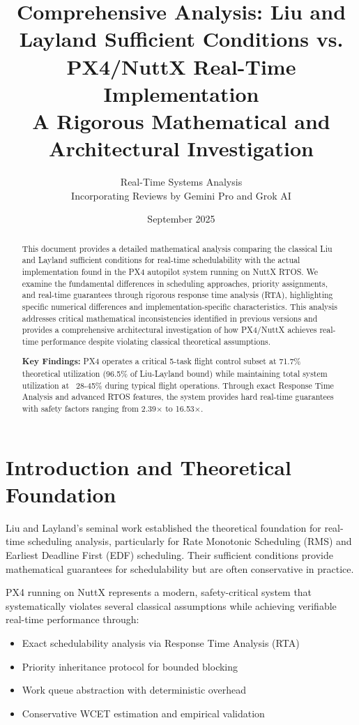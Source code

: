 \documentclass[12pt,a4paper]{article}
\title{Comprehensive Analysis: Liu and Layland Sufficient Conditions vs. PX4/NuttX Real-Time Implementation\\
\large{A Rigorous Mathematical and Architectural Investigation}}
\author{Real-Time Systems Analysis\\
\small{Incorporating Reviews by Gemini Pro and Grok AI}}
\date{September 2025}
\begin{document}
\maketitle

\begin{abstract}
This document provides a detailed mathematical analysis comparing the classical Liu and Layland sufficient conditions for real-time schedulability with the actual implementation found in the PX4 autopilot system running on NuttX RTOS. We examine the fundamental differences in scheduling approaches, priority assignments, and real-time guarantees through rigorous response time analysis (RTA), highlighting specific numerical differences and implementation-specific characteristics. This analysis addresses critical mathematical inconsistencies identified in previous versions and provides a comprehensive architectural investigation of how PX4/NuttX achieves real-time performance despite violating classical theoretical assumptions.

\textbf{Key Findings:} PX4 operates a critical 5-task flight control subset at 71.7\% theoretical utilization (96.5\% of Liu-Layland bound) while maintaining total system utilization at ~28-45\% during typical flight operations. Through exact Response Time Analysis and advanced RTOS features, the system provides hard real-time guarantees with safety factors ranging from 2.39$\times$ to 16.53$\times$.
\end{abstract}

\section{Introduction and Theoretical Foundation}

Liu and Layland's seminal work \cite{liu1973scheduling} established the theoretical foundation for real-time scheduling analysis, particularly for Rate Monotonic Scheduling (RMS) and Earliest Deadline First (EDF) scheduling. Their sufficient conditions provide mathematical guarantees for schedulability but are often conservative in practice.

PX4 running on NuttX represents a modern, safety-critical system that systematically violates several classical assumptions while achieving verifiable real-time performance through:
\begin{itemize}
\item Exact schedulability analysis via Response Time Analysis (RTA)
\item Priority inheritance protocol for bounded blocking
\item Work queue abstraction with deterministic overhead
\item Conservative WCET estimation and empirical validation
\end{itemize}
\end{document}
